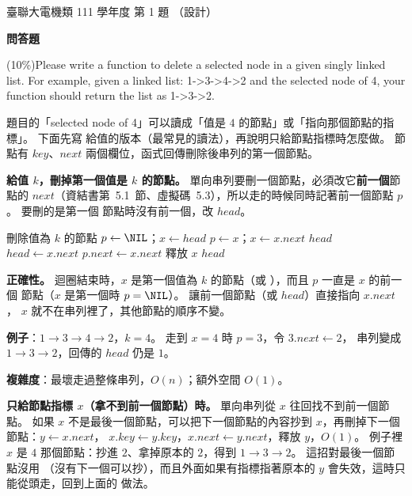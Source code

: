 \begin{pastexam}[label={px:ust-111-ee-ds-01}]{臺聯大電機類 111 學年度 第 1 題}
（設計）

\textbf{問答題}

(10\%)Please write a function to delete a selected node in a given singly linked list. For example,
given a linked list: 1->3->4->2 and the selected node of 4, your function should return the list as
1->3->2.
\end{pastexam}

\begin{pastsoln}
題目的「selected node of 4」可以讀成「值是 $4$ 的節點」或「指向那個節點的指標」。 下面先寫
給值的版本（最常見的讀法），再說明只給節點指標時怎麼做。 節點有 $\mathit{key}$、$\mathit{next}$
兩個欄位，函式回傳刪除後串列的第一個節點。

\textbf{給值 $k$，刪掉第一個值是 $k$ 的節點。} 單向串列要刪一個節點，必須改它\textbf{前一個}節點的
$\mathit{next}$（資結書第~5.1~節、虛擬碼~5.3），所以走的時候同時記著前一個節點 $p$。 要刪的是第一個
節點時沒有前一個，改 $\mathit{head}$。

\begin{pseudo}{刪除值為 $k$ 的節點}
    \State $p \gets \NIL$；$x \gets \mathit{head}$
        \State $p \gets x$；$x \gets x.\mathit{next}$
    \EndWhile
        \State \Return $\mathit{head}$ 
    \EndIf
        \State $\mathit{head} \gets x.\mathit{next}$ 
    \Else
        \State $p.\mathit{next} \gets x.\mathit{next}$
    \EndIf
    \State 釋放 $x$
    \State \Return $\mathit{head}$
\EndFunction
\end{pseudo}

\textbf{正確性。} 迴圈結束時，$x$ 是第一個值為 $k$ 的節點（或 \NIL），而且 $p$ 一直是 $x$ 的前一個
節點（$x$ 是第一個時 $p = \NIL$）。 讓前一個節點（或 $\mathit{head}$）直接指向 $x.\mathit{next}$，
$x$ 就不在串列裡了，其他節點的順序不變。

\textbf{例子}：$1 \to 3 \to 4 \to 2$，$k = 4$。 走到 $x = 4$ 時 $p = 3$，令 $3.\mathit{next} \gets 2$，
串列變成 $1 \to 3 \to 2$，回傳的 $\mathit{head}$ 仍是 $1$。

\textbf{複雜度}：最壞走過整條串列，$O(n)$；額外空間 $O(1)$。

\textbf{只給節點指標 $x$（拿不到前一個節點）時。} 單向串列從 $x$ 往回找不到前一個節點。 如果 $x$
不是最後一個節點，可以把下一個節點的內容抄到 $x$，再刪掉下一個節點：$y \gets x.\mathit{next}$，
$x.\mathit{key} \gets y.\mathit{key}$，$x.\mathit{next} \gets y.\mathit{next}$，釋放 $y$，$O(1)$。
例子裡 $x$ 是 $4$ 那個節點：抄進 $2$、拿掉原本的 $2$，得到 $1 \to 3 \to 2$。 這招對最後一個節點沒用
（沒有下一個可以抄），而且外面如果有指標指著原本的 $y$ 會失效，這時只能從頭走，回到上面的
做法。
\end{pastsoln}

